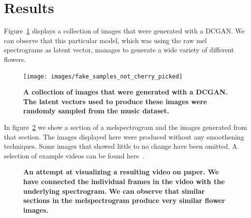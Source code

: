     \section{Results}

        Figure~\ref{fig:dcgan_samples} displays a collection of images that were generated with a DCGAN. We can observe that this particular model, which was using the raw mel spectrograms as latent vector, manages to generate a wide variety of different flowers.

        \begin{figure}[ht]
            \centering
            \texttt{[image: images/fake\_samples\_not\_cherry\_picked]}
            \caption[not used]
            {
                \textbf{A collection of images that were generated with a DCGAN. The latent vectors used to produce these images were randomly sampled from the music dataset.}
            }
            \label{fig:dcgan_samples}
        \end{figure}
        
        \newpage
        In figure~\ref{fig:video} we show a section of a melspectrogram and the images generated from that section. The images displayed here were produced without any smoothening techniques. Some images that showed little to no change have been omitted. A selection of example videos can be found here~\cite{examples}.

        \begin{figure}[ht!]
            \centering
            \caption[not used]
            {
                \textbf{An attempt at visualizing a resulting video on paper. We have connected the individual frames in the video with the underlying spectrogram. We can observe that similar sections in the melspectrogram produce very similar flower images.}
            }
            \label{fig:video}
        \end{figure}

